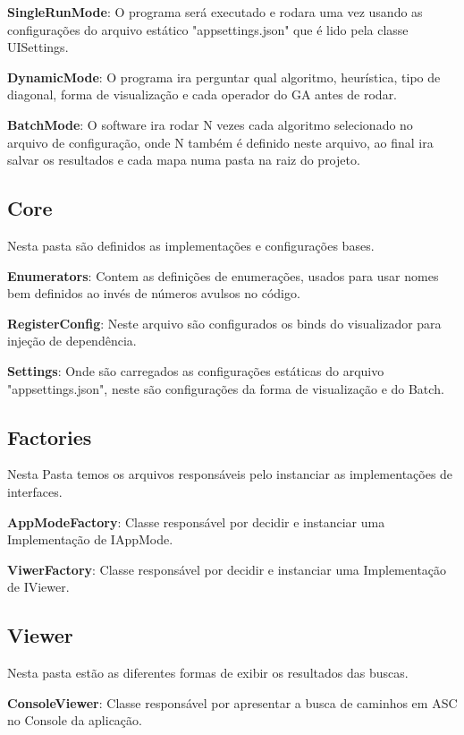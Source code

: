  \textbf{SingleRunMode}: O programa será executado e rodara uma vez usando as configurações do arquivo estático "appsettings.json" que é lido pela classe UISettings.
 
 \textbf{DynamicMode}: O programa ira perguntar qual algoritmo, heurística, tipo de diagonal, forma de visualização e cada operador do GA antes de rodar.
 
 \textbf{BatchMode}: O software ira rodar N vezes cada algoritmo selecionado no arquivo de configuração, onde N também é definido neste arquivo, ao final ira salvar os resultados e cada mapa numa pasta na raiz do projeto.
 
 
 \subsection{Core}
 
 Nesta pasta são definidos as implementações e configurações bases.
 
 \textbf{Enumerators}: Contem as definições de enumerações, usados para usar nomes bem definidos ao invés de números avulsos no código.
 
 \textbf{RegisterConfig}: Neste arquivo são configurados os binds do visualizador para injeção de dependência.
 
 \textbf{Settings}: Onde são carregados as configurações estáticas do arquivo "appsettings.json", neste são configurações da forma de visualização e do Batch.
 
 \subsection{Factories}
 
 Nesta Pasta temos os arquivos responsáveis pelo instanciar as implementações de interfaces.
 
 \textbf{AppModeFactory}: Classe responsável por decidir e instanciar uma Implementação de IAppMode.
 
 \textbf{ViwerFactory}: Classe responsável por decidir e instanciar uma Implementação de IViewer.
 
 \subsection{Viewer}
 
 Nesta pasta estão as diferentes formas de exibir os resultados das buscas.
 
 \textbf{ConsoleViewer}: Classe responsável por apresentar a busca de caminhos em ASC no Console da aplicação.
 
